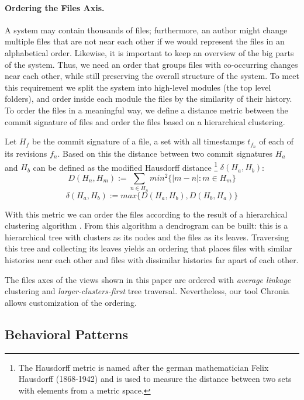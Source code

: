 \documentclass[10pt]{book}
\begin{document}
\paragraph{Ordering the Files Axis.}
A system may contain thousands of files; furthermore, an author might change multiple files that are not near each other if we would represent the files in an alphabetical order. Likewise, it is important to keep an overview of the big parts of the system. Thus, we need an order that groups files with co-occurring changes near each other, while still preserving the overall structure of the system. To meet this requirement we split the system into high-level modules (\eg the top level folders), and order inside each module the files by the similarity of their history. To order the files in a meaningful way, we define a distance metric between the commit signature of files and order the files based on a hierarchical clustering.

Let $H_f$ be the commit signature of a file, a set with all timestamps $t_{f_n}$ of each of its revisions $f_n$. Based on this the distance between two commit signatures $H_a$ and $H_b$ can be defined as the modified Hausdorff distance \footnote{The Hausdorff metric is named after the german mathematician Felix Hausdorff (1868-1942) and is used to measure the distance between two sets with elements from a metric space.} $\delta(H_a,H_b)$:
\[
D(H_n,H_m) := \sum_{n \in H_n} min^2 \{ \vert m -n \vert : m \in H_m \}
\]
\[
\delta(H_a,H_b) := max \{ D(H_a,H_b), D(H_b,H_a) \}
\]

With this metric we can order the files according to the result of a hierarchical clustering algorithm \cite{Jain99a}. From this algorithm a dendrogram can be built: this is a hierarchical tree with clusters as its nodes and the files as its leaves. Traversing this tree and collecting its leaves yields an ordering that places files with similar histories near each other and files with dissimilar histories far apart of each other.

The files axes of the \omap views shown in this paper are ordered with \textit{average linkage} clustering and \textit{larger-clusters-first} tree traversal. Nevertheless, our tool Chronia allows customization of the ordering.

\subsection{Behavioral Patterns}
\end{document}
